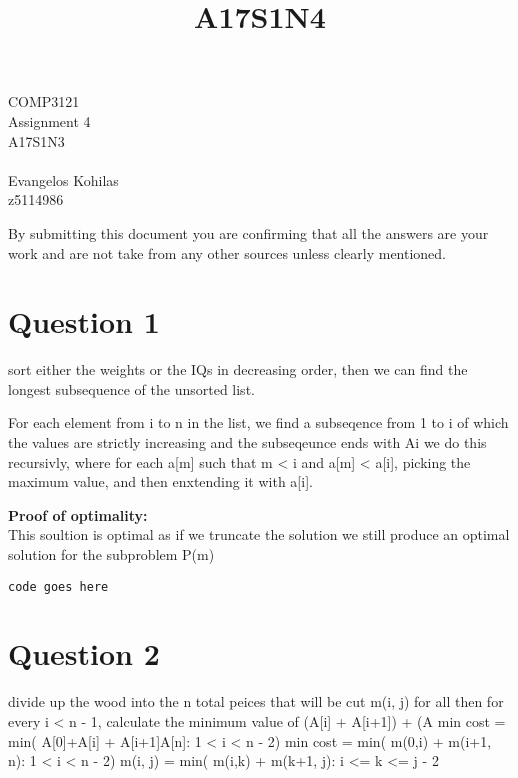 \documentclass{article}
\title{A17S1N4}
\begin{document}
\begin{center}
    \begin{LARGE}
        COMP3121\\
        Assignment 4\\
        A17S1N3\\
        \hrulefill\\
        Evangelos Kohilas\\
        z5114986\\
        \hrulefill
    \end{LARGE}

    \begin{large}
        By submitting this document you are confirming that all the answers are your work and are not take from any other sources unless clearly mentioned.
    \end{large}

\end{center}

\section*{Question 1}
sort either the weights or the IQs in decreasing order, then we can find the longest subsequence of the unsorted list.

For each element from i to n in the list, we find a subseqence from 1 to i of which the values are strictly increasing and the subseqeunce ends with Ai
we do this recursivly, where for each a[m] such that m < i and a[m] < a[i], picking the maximum value, and then enxtending it with a[i].

\textbf{Proof of optimality:}\\
This soultion is optimal as if we truncate the solution we still produce an optimal solution for the subproblem P(m)


\begin{verbatim}
code goes here
\end{verbatim}

\pagebreak
\section*{Question 2}
divide up the wood into the n total peices that will be cut
m(i, j) for all
then for every i < n - 1, calculate the minimum value of (A[i] + A[i+1]) + (A
min cost = min( A[0]+A[i] + A[i+1]A[n]:  1 < i < n - 2)
min cost = min( m(0,i) + m(i+1, n):  1 < i < n - 2)
m(i, j)  = min( m(i,k) + m(k+1, j): i <= k <= j - 2
\end{document}
